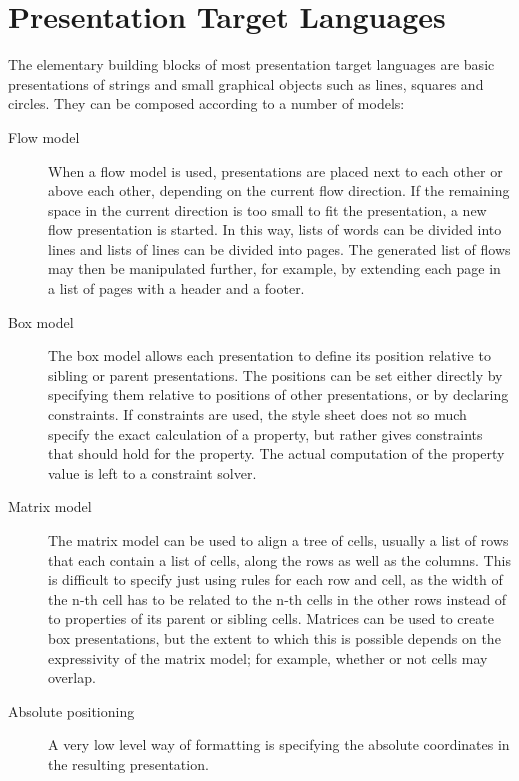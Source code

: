 \section{Presentation Target Languages}
\label{targetlangs}
\par The elementary building blocks of most presentation target languages are
      basic presentations of strings and small graphical objects such as lines,
      squares and circles. They can be composed according to a number of models:
 \begin{description}
 
 \item[Flow model]
When a flow model is used, presentations are placed next to each
        other or above each other, depending on the current flow direction. If the
        remaining space in the current direction is too small to fit the presentation,
        a new flow presentation is started. In this way, lists of words can be divided
        into lines and lists of lines can be divided into pages. The generated list of
        flows may then be manipulated further, for example, by extending each page in a
        list of pages with a header and a footer.
 \item[Box model]
The box model allows each presentation to define its position
        relative to sibling or parent presentations. The positions can be set either
        directly by specifying them relative to positions of other presentations, or by
        declaring constraints. If constraints are used, the style sheet does not so
        much specify the exact calculation of a property, but rather gives constraints
        that should hold for the property. The actual computation of the property value
        is left to a constraint solver. 
 \item[Matrix model]
The matrix model can be used to align a tree of cells, usually a list
        of rows that each contain a list of cells, along the rows as well as the
        columns. This is difficult to specify just using rules for each row and cell,
        as the width of the n-th cell has to be related to the n-th cells in the other
        rows instead of to properties of its parent or sibling cells. Matrices can be
        used to create box presentations, but the extent to which this is possible
        depends on the expressivity of the matrix model; for example, whether or not
        cells may overlap.
 \item[Absolute positioning]
A very low level way of formatting is specifying the absolute
        coordinates in the resulting presentation.
 \end{description}

